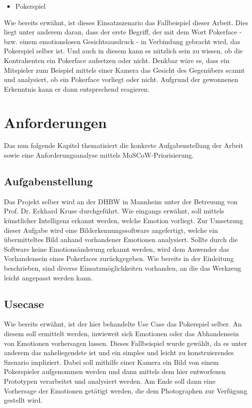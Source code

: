 \documentclass[12pt, a4paper]{report}
\begin{document}
\begin{itemize}
	\item{Pokerspiel}
\end{itemize}
Wie bereits erwähnt, ist dieses Einsatzszenario das Fallbeispiel dieser Arbeit. Dies liegt unter anderem daran, dass der erste Begriff, der mit dem Wort Pokerface - bzw. einem emotionslosen Gesichtsausdruck - in Verbindung gebracht wird, das Pokerspiel selber ist. Und auch in diesem kann es nützlich sein zu wissen, ob die Kontrahenten ein Pokerface aufsetzen oder nicht. Denkbar wäre es, dass ein Mitspieler zum Beispiel mittels einer Kamera das Gesicht des Gegenübers scannt und analysiert, ob ein Pokerface vorliegt oder nicht. Aufgrund der gewonnenen Erkenntnis kann er dann entsprechend reagieren.

\chapter{Anforderungen}
Das nun folgende Kapitel thematisiert die konkrete Aufgabenstellung der Arbeit sowie eine Anforderungsanalyse mittels MoSCoW-Priorisierung. 

\section{Aufgabenstellung}
Das Projekt selber wird an der DHBW in Mannheim unter der Betreuung von Prof. Dr. Eckhard Kruse durchgeführt. Wie eingangs erwähnt, soll mittels künstlicher Intelligenz erkannt werden, welche Emotion vorliegt. Zur Umsetzung dieser Aufgabe wird eine Bilderkennungssoftware angefertigt, welche ein übermitteltes Bild anhand vorhandener Emotionen analysiert. Sollte durch die Software keine Emotionsänderung erkannt werden, wird dem Anwender das Vorhandensein eines Pokerfaces zurückgegeben. Wie bereits in der Einleitung beschrieben, sind diverse Einsatzmöglichkeiten vorhanden, an die das Werkzeug leicht angepasst werden kann.

\section{Usecase}
Wie bereits erwähnt, ist der hier behandelte Use Case das Pokerspiel selber. An diesem soll ermittelt werden, inwieweit sich Emotionen oder das Abhandensein von Emotionen vorhersagen lassen. Dieses Fallbeispiel wurde gewählt, da es unter anderem das naheliegendste ist und ein simples und leicht zu konstruierendes Szenario impliziert. Dabei soll mithilfe einer Kamera ein Bild von einem Pokerspieler aufgenommen werden und dann mittels dem hier entworfenen Prototypen verarbeitet und analysiert werden. Am Ende soll dann eine Vorhersage der Emotionen getätigt werden, die dem Photographen zur Verfügung gestellt wird.
\end{document}
